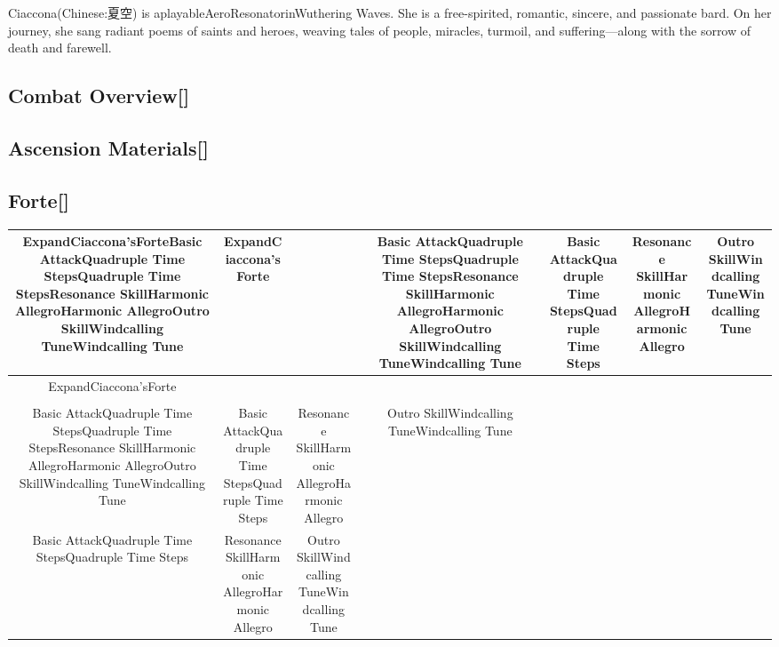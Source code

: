 \documentclass[a4paper,12pt]{article}
\begin{document}
Ciaccona(Chinese:夏空) is aplayableAeroResonatorinWuthering Waves. She is a free-spirited, romantic, sincere, and passionate bard. On her journey, she sang radiant poems of saints and heroes, weaving tales of people, miracles, turmoil, and suffering—along with the sorrow of death and farewell.\\ \par \vspace{0.5cm}

\subsection*{Combat Overview[]}\n\n\subsection*{Ascension Materials[]}\n\n\subsection*{Forte[]}\n\n\begin{tabular}{|c|c|c|c|c|c|c|} \hline
ExpandCiaccona'sForteBasic AttackQuadruple Time StepsQuadruple Time StepsResonance SkillHarmonic AllegroHarmonic AllegroOutro SkillWindcalling TuneWindcalling Tune & ExpandCiaccona'sForte &  & Basic AttackQuadruple Time StepsQuadruple Time StepsResonance SkillHarmonic AllegroHarmonic AllegroOutro SkillWindcalling TuneWindcalling Tune & Basic AttackQuadruple Time StepsQuadruple Time Steps & Resonance SkillHarmonic AllegroHarmonic Allegro & Outro SkillWindcalling TuneWindcalling Tune \\
 \hline
ExpandCiaccona'sForte \\
 \\
Basic AttackQuadruple Time StepsQuadruple Time StepsResonance SkillHarmonic AllegroHarmonic AllegroOutro SkillWindcalling TuneWindcalling Tune & Basic AttackQuadruple Time StepsQuadruple Time Steps & Resonance SkillHarmonic AllegroHarmonic Allegro & Outro SkillWindcalling TuneWindcalling Tune \\
Basic AttackQuadruple Time StepsQuadruple Time Steps & Resonance SkillHarmonic AllegroHarmonic Allegro & Outro SkillWindcalling TuneWindcalling Tune \\
\end{tabular}\\ \par \vspace{0.5cm}
\end{document}
